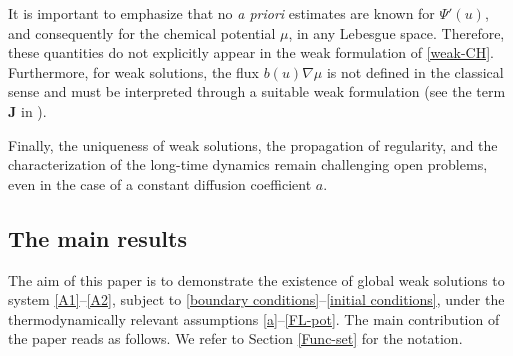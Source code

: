 \documentclass[11pt,  reqno]{amsart}%
\theoremstyle{plain}
\theoremstyle{definition}
\theoremstyle{remark}
\numberwithin{equation}{section}
\begin{document}
It is important to emphasize that no {\it a priori} estimates are known for $\Psi'(u)$, and consequently for the chemical potential $\mu$, in any Lebesgue space. Therefore, these quantities do not explicitly appear in the weak formulation of \eqref{weak-CH}. Furthermore, for weak solutions, the flux $b(u)\nabla \mu$ is not defined in the classical sense and must be interpreted through a suitable weak formulation (see the term $\boldsymbol{J}$ in \cite[Theorem 1]{EG1996}). 
 
Finally, the uniqueness of weak solutions, the propagation of regularity, and the characterization of the long-time dynamics remain challenging open problems, even in the case of a constant diffusion coefficient $a$.

\subsection{The main results} 
The aim of this paper is to demonstrate the existence of global weak solutions to system \eqref{A1}--\eqref{A2}, subject to \eqref{boundary conditions}--\eqref{initial conditions}, under the thermodynamically relevant assumptions \eqref{a}--\eqref{FL-pot}.
The main contribution of the paper reads as follows. We refer to Section \ref{Func-set} for the notation.
\end{document}
